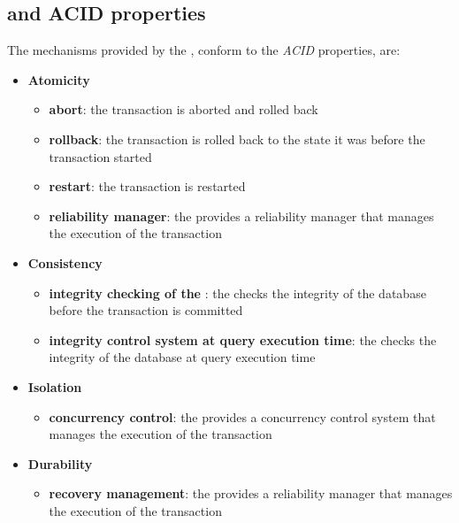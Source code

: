 \documentclass[english]{article}
\begin{document}
\subsection{\dbms and ACID properties}

The mechanisms provided by the \dbms, conform to the \textit{ACID} properties, are:

\begin{itemize}
  \item \textbf{Atomicity}
        \begin{itemize}
          \item \textbf{abort}: the transaction is aborted and rolled back
          \item \textbf{rollback}: the transaction is rolled back to the state it was before the transaction started
          \item \textbf{restart}: the transaction is restarted
          \item \textbf{reliability manager}: the \dbms provides a reliability manager that manages the execution of the transaction
        \end{itemize}
  \item \textbf{Consistency}
        \begin{itemize}
          \item \textbf{integrity checking of the \dbms}: the \dbms checks the integrity of the database before the transaction is committed
          \item \textbf{integrity control system at query execution time}: the \dbms checks the integrity of the database at query execution time
        \end{itemize}
  \item \textbf{Isolation}
        \begin{itemize}
          \item \textbf{concurrency control}: the \dbms provides a concurrency control system that manages the execution of the transaction
        \end{itemize}
  \item \textbf{Durability}
        \begin{itemize}
          \item \textbf{recovery management}: the \dbms provides a reliability manager that manages the execution of the transaction
        \end{itemize}
\end{itemize}

\clearpage
\end{document}
